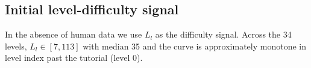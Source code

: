 \subsection{Initial level-difficulty signal}

In the absence of human data we use $L_l$ as the difficulty signal. Across the 34
levels, $L_l \in [7, 113]$ with median 35 and the curve is approximately monotone in
level index past the tutorial (level 0).

